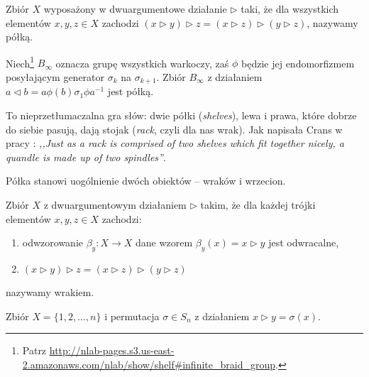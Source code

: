 \begin{definition}[półka]
%
    Zbiór $X$ wyposażony w dwuargumentowe działanie $\triangleright$ taki, że dla wszystkich elementów $x, y, z \in X$ zachodzi $(x \triangleright y) \triangleright z = (x \triangleright z) \triangleright (y \triangleright z)$, nazywamy półką.
\end{definition}

\begin{example}
%
    Niech\footnote{Patrz \url{http://nlab-pages.s3.us-east-2.amazonaws.com/nlab/show/shelf\#infinite_braid_group}.} $B_\infty$ oznacza grupę wszystkich warkoczy, zaś $\phi$ będzie jej endomorfizmem posyłającym generator $\sigma_k$ na $\sigma_{k+1}$.
    Zbiór $B_\infty$ z działaniem $a \triangleleft b = a\phi(b)\sigma_1 \phi{a} ^{-1}$ jest półką.
\end{example}

To nieprzetłumaczalna gra słów: dwie półki (\emph{shelves}), lewa i prawa, które dobrze do siebie pasują, dają stojak (\emph{rack}, czyli dla nas wrak).
Jak napisała Crans w pracy \cite[s. 86]{crans04}: \emph{,,Just as a rack is comprised of two shelves which fit together nicely, a quandle is made up of two spindles''}.
%

Półka stanowi uogólnienie dwóch obiektów -- wraków i wrzecion.

\begin{definition}[wrak]
%
    Zbiór $X$ z dwuargumentowym działaniem $\triangleright$ takim, że dla każdej trójki elementów $x, y, z \in X$ zachodzi:
    \begin{enumerate}
        \item odwzorowanie $\beta_y \colon X \to X$ dane wzorem $\beta_y(x) = x \triangleright y$ jest odwracalne,
        \item $(x \triangleright y) \triangleright z = (x \triangleright z) \triangleright (y \triangleright z)$
    \end{enumerate}
    nazywamy wrakiem.
\end{definition}

\begin{example}
    Zbiór $X = \{1, 2, \ldots, n\}$ i permutacja $\sigma \in S_n$ z działaniem $x \triangleright y = \sigma(x)$.
\end{example}

